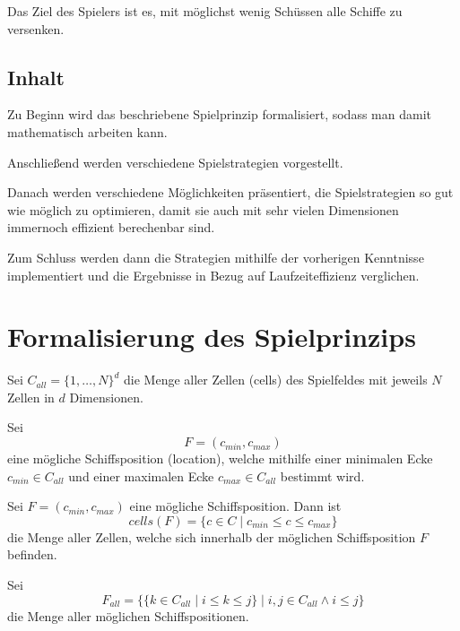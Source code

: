 \documentclass[a4paper,12pt]{llncs}
\numberwithin{equation}{section}
\newcommand{\bildbreite}[5]{
  \begin{figure}[htbp]
    \begin{center}
      \texttt{[image: \#1]}
      \caption[#5]{#4}
      \label{#3}
    \end{center}
  \end{figure}
}
\begin{document}
Das Ziel des Spielers ist es, mit möglichst wenig Schüssen alle Schiffe zu versenken.


\subsection{Inhalt}
Zu Beginn wird das beschriebene Spielprinzip formalisiert, sodass man damit mathematisch arbeiten kann.

Anschließend werden verschiedene Spielstrategien vorgestellt.

Danach werden verschiedene Möglichkeiten präsentiert, die Spielstrategien so gut wie möglich zu optimieren, damit sie auch mit sehr vielen Dimensionen immernoch effizient berechenbar sind.

Zum Schluss werden dann die Strategien mithilfe der vorherigen Kenntnisse implementiert und die Ergebnisse in Bezug auf Laufzeiteffizienz verglichen.

\section{Formalisierung des Spielprinzips}

\begin{definition}
Sei $C_{all}=\{1, \dots, N\}^d$ die Menge aller Zellen (cells) des Spielfeldes mit jeweils $N$ Zellen in $d$ Dimensionen.
\end{definition}

\begin{definition}
Sei
\[
F=(c_{min}, c_{max})
\]
eine mögliche Schiffsposition (location), welche mithilfe einer minimalen Ecke $c_{min} \in C_{all}$ und einer maximalen Ecke $c_{max} \in C_{all}$ bestimmt wird.
\end{definition}

\begin{definition}
Sei $F=(c_{min}, c_{max})$ eine mögliche Schiffsposition.
Dann ist
\[
cells(F)=
\{
c
\in
C
\mid
c_{min} \leq c \leq c_{max}
\}
\]
die Menge aller Zellen, welche sich innerhalb der möglichen Schiffsposition $F$ befinden.
\end{definition}

\begin{definition}
Sei 
\[
F_{all}=
\{
\{
k
\in
C_{all}
\mid
i \leq k \leq j
\}
\mid
i,j \in C_{all}
\wedge
i \leq j
\}
\] die Menge aller möglichen Schiffspositionen.
\end{definition}
\end{document}
